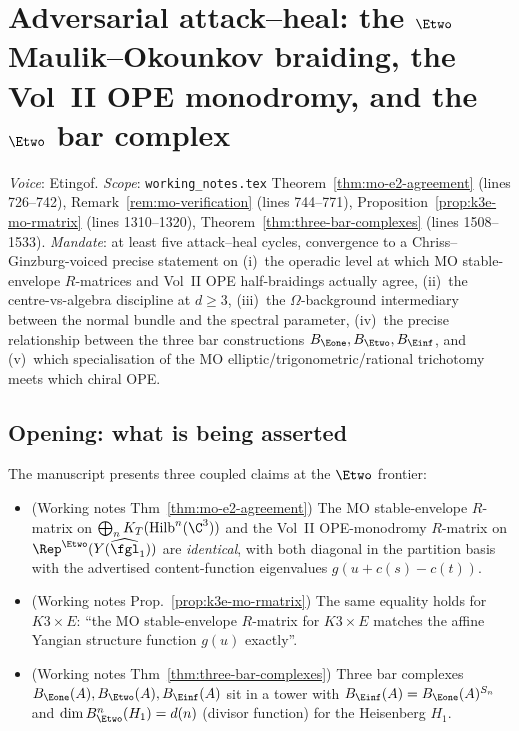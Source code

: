 \section{Adversarial attack--heal: the $\Etwo$ Maulik--Okounkov braiding,
the Vol~II OPE monodromy, and the $\Etwo$ bar complex}
\label{wave12:sec:a3-MO-E2-etingof}

\emph{Voice}: Etingof.  \emph{Scope}:
\texttt{working\_notes.tex} Theorem~\ref{thm:mo-e2-agreement} (lines
726--742), Remark~\ref{rem:mo-verification} (lines 744--771),
Proposition~\ref{prop:k3e-mo-rmatrix} (lines 1310--1320),
Theorem~\ref{thm:three-bar-complexes} (lines 1508--1533).
\emph{Mandate}: at least five attack--heal cycles, convergence to a
Chriss--Ginzburg-voiced precise statement on (i)~the operadic level at
which MO stable-envelope $R$-matrices and Vol~II OPE half-braidings
actually agree, (ii)~the centre-vs-algebra discipline at $d\geq 3$,
(iii)~the $\Omega$-background intermediary between the normal bundle
and the spectral parameter, (iv)~the precise relationship between the
three bar constructions $B_{\Eone}, B_{\Etwo}, B_{\Einf}$, and (v)~which
specialisation of the MO elliptic/trigonometric/rational trichotomy
meets which chiral OPE.

\providecommand{\ClaimStatusTheorem}{\textsc{[theorem, cited]}}
\providecommand{\ClaimStatusProvedHere}{\textsc{[proved here]}}
\providecommand{\ClaimStatusConjectured}{\textsc{[conjectural]}}
\providecommand{\ClaimStatusConditional}{\textsc{[conditional]}}
\providecommand{\ClaimStatusDerivation}{\textsc{[first-principles derivable]}}
\providecommand{\ClaimStatusFALSE}{\textsc{[FALSIFIED]}}

\subsection*{Opening: what is being asserted}

The manuscript presents three coupled claims at the $\Etwo$ frontier:

\begin{itemize}
\item[(M1)] (Working notes Thm~\ref{thm:mo-e2-agreement}) The MO
stable-envelope $R$-matrix on
$\bigoplus_n K_T(\mathrm{Hilb}^n(\C^3))$ and the Vol~II OPE-monodromy
$R$-matrix on $\Rep^{\Etwo}(Y(\widehat{\fgl}_1))$ are
\emph{identical}, with both diagonal in the partition basis with the
advertised content-function eigenvalues $g(u + c(s) - c(t))$.
\item[(M2)] (Working notes Prop.~\ref{prop:k3e-mo-rmatrix}) The same
equality holds for $K3\times E$: ``the MO stable-envelope $R$-matrix
for $K3\times E$ matches the affine Yangian structure function $g(u)$
exactly''.
\item[(M3)] (Working notes Thm~\ref{thm:three-bar-complexes}) Three bar
complexes $B_{\Eone}(A), B_{\Etwo}(A), B_{\Einf}(A)$ sit in a tower
with $B_{\Einf}(A) = B_{\Eone}(A)^{S_n}$ and
$\dim B_{\Etwo}^n(H_1) = d(n)$ (divisor function) for the Heisenberg
$H_1$.
\end{itemize}

